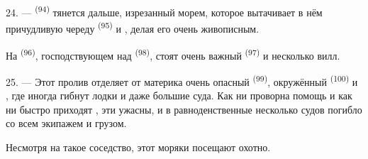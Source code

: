 \VUsaut{3.0mm}
\VUsaut{3.0mm}

24. ---  \textsuperscript{(94)} тянется дальше, изрезанный морем,
которое вытачивает в нём причудливую череду  \textsuperscript{(95)}
и , делая его очень живописным.

На  \textsuperscript{(96)}, господствующем над 
\textsuperscript{(98)}, стоят очень важный  \textsuperscript{(97)} и
несколько вилл.

25. --- Этот пролив отделяет от материка очень опасный 
\textsuperscript{(99)}, окружённый  \textsuperscript{(100)} и
, где иногда гибнут лодки и даже большие суда. Как ни
проворна помощь и как ни быстро приходят , эти
 ужасны, и в равноденственные 
несколько судов погибло со всем экипажем и грузом.

Несмотря на такое соседство,  этот моряки посещают охотно.
\VUsaut{6.0mm}
\VUfilet{22mm}
